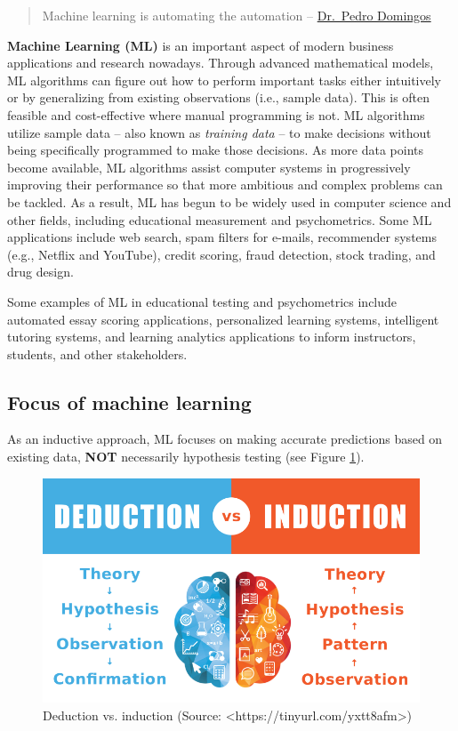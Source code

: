 \documentclass[]{book}
\begin{document}
\begin{quote}
Machine learning is automating the automation -- \href{https://homes.cs.washington.edu/~pedrod/}{Dr.~Pedro Domingos}
\end{quote}

\textbf{Machine Learning (ML)} is an important aspect of modern business applications and research nowadays. Through advanced mathematical models, ML algorithms can figure out how to perform important tasks either intuitively or by generalizing from existing observations (i.e., sample data). This is often feasible and cost-effective where manual programming is not. ML algorithms utilize sample data -- also known as \emph{training data} -- to make decisions without being specifically programmed to make those decisions. As more data points become available, ML algorithms assist computer systems in progressively improving their performance so that more ambitious and complex problems can be tackled. As a result, ML has begun to be widely used in computer science and other fields, including educational measurement and psychometrics. Some ML applications include web search, spam filters for e-mails, recommender systems (e.g., Netflix and YouTube), credit scoring, fraud detection, stock trading, and drug design.

Some examples of ML in educational testing and psychometrics include automated essay scoring applications, personalized learning systems, intelligent tutoring systems, and learning analytics applications to inform instructors, students, and other stakeholders.

\hypertarget{focus-of-machine-learning}{%
\subsection{Focus of machine learning}\label{focus-of-machine-learning}}

As an inductive approach, ML focuses on making accurate predictions based on existing data, \textbf{NOT} necessarily hypothesis testing (see Figure \ref{fig:fig5-1}).

\begin{figure}
\includegraphics[width=1\linewidth]{images/deduction2} \caption{Deduction vs. induction (Source: <https://tinyurl.com/yxtt8afm>)}\label{fig:fig5-1}
\end{figure}
\end{document}
